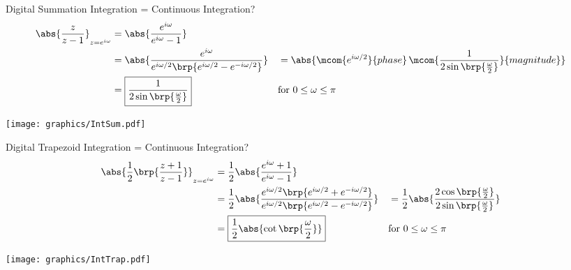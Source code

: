 \vfill
Digital Summation Integration = Continuous Integration?
\vfill
\begin{align*}
  \abs{\frac{z}{z-1}}_{z=e^{i\omega}}
    &= \abs{\frac{e^{i\omega}}{e^{i\omega}-1}}
  \\&= \abs{\frac{e^{i\omega}}{e^{i\omega/2}\brp{e^{i\omega/2}-e^{-i\omega/2}}}}
   &&= \abs{\mcom{e^{i\omega/2}}{phase}\,\mcom{\frac{1}{2\sin\brp{\frac{\omega}{2}}}}{magnitude}}
  \\&= \boxed{\frac{1}{2\sin\brp{\frac{\omega}{2}}}} 
    && \text{for $0\le\omega\le\pi$}
\end{align*}


\texttt{[image: graphics/IntSum.pdf]}


\vfill
Digital Trapezoid Integration = Continuous Integration?
\vfill
\begin{align*}
  \abs{\frac{1}{2}\brp{\frac{z+1}{z-1}}}_{z=e^{i\omega}}
    &= \frac{1}{2}
       \abs{\frac{e^{i\omega}+1}{e^{i\omega}-1}}
  \\&= \frac{1}{2}
       \abs{\frac{e^{i\omega/2}\brp{e^{i\omega/2}+e^{-i\omega/2}}}
                 {e^{i\omega/2}\brp{e^{i\omega/2}-e^{-i\omega/2}}}
           }
   &&= \frac{1}{2}
       \abs{\frac{2\cos\brp{\frac{\omega}{2}}}
                 {2\sin\brp{\frac{\omega}{2}}}
           }
  \\&= \boxed{\frac{1}{2} \abs{\cot\brp{\frac{\omega}{2}}}}
    && \text{for $0\le\omega\le\pi$}
\end{align*}


\texttt{[image: graphics/IntTrap.pdf]}



